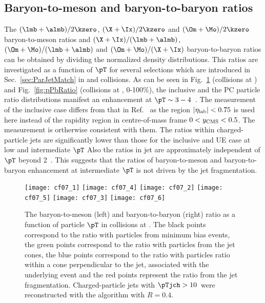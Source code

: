 \documentclass[ALICE,manyauthors]{cernphprep}
\begin{document}
\subsection{Baryon-to-meson and baryon-to-baryon ratios}
\label{subsec:ParRatios}
The $(\lmb + \almb)/2\kzero$, $(\X + \Ix)/2\kzero$ and $(\Om + \Mo)/2\kzero$ baryon-to-meson ratios and $(\X + \Ix)/(\lmb + \almb)$, $(\Om + \Mo)/(\lmb + \almb)$ and $(\Om + \Mo)/(\X + \Ix)$ baryon-to-baryon ratios can be obtained by dividing the normalized density distributions.
This ratios are investigated as a function of $\pT$ for several selections which are introduced in Sec.~\ref{sec:ParJetMatch} in \pp and \pPb collisions.
As can be seen in Fig.~\ref{fig:ppRatio} (\pp collisions at \thirteen) and Fig.~\ref{fig:pPbRatio} (\pPb collisions at \fivenn, 0-100\%), the inclusive and the PC particle ratio distributions manifest an enhancement at $\pT \sim 3 - 4 $~\GeVc.
The measurement of the inclusive case differs from that in Ref.~\cite{ALICE:2015mpp, ALICE:2016dei, ALICE:2013wgn} as the region $|\eta_{\rm lab}| < 0.75$ is used here instead of the rapidity region in centre-of-mass frame $0 < y_{\rm CMS} < 0.5$. 
The measurement is ortherwise consistent with them.
The ratios within charged-particle jets are significantly lower than those for the inclusive and UE case at low and intermediate $\pT$ 
Also the ratios in jet are approximately independent of $\pT$ beyond 2~\GeVc.
This suggests that the ratios of baryon-to-meson and baryon-to-baryon enhancement at intermediate $\pT$ is not driven by the jet fragmentation.
\begin{figure}[!ht]
	\begin{center}
		\texttt{[image: cf07\_1]}
		\texttt{[image: cf07\_4]}
		\texttt{[image: cf07\_2]}
		\texttt{[image: cf07\_5]}
		\texttt{[image: cf07\_3]}
		\texttt{[image: cf07\_6]}
	\end{center}
	\caption{The baryon-to-meson (left) and baryon-to-baryon (right) ratio as a function of particle $\pT$ in \pp collisions at \thirteen. The black points correspond to the ratio with particles from minimum bias events, the green points correspond to the ratio with particles from the jet cones, the blue points correspond to the ratio with particles ratio within a cone perpendicular to the jet, associated with the underlying event and the red points represent the ratio from the jet fragmentation. Charged-particle jets with $\pTjch > 10$~\GeVc were reconstructed with the \akT algorithm with $R = 0.4$.}
	\label{fig:ppRatio}
\end{figure}
\end{document}
